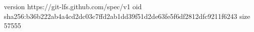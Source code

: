 version https://git-lfs.github.com/spec/v1
oid sha256:b36b222ab4a4cd2dc03c7ffd2ab1dd39f51d2de63fe5f6df2812dfc9211f6243
size 57555
